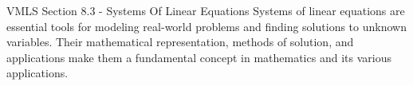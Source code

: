 \begin{notes}{VMLS Section 8.3 - Systems Of Linear Equations}
    Systems of linear equations are essential tools for modeling real-world problems and finding solutions to unknown variables. Their mathematical representation, methods of solution, and applications 
    make them a fundamental concept in mathematics and its various applications.
\end{notes}